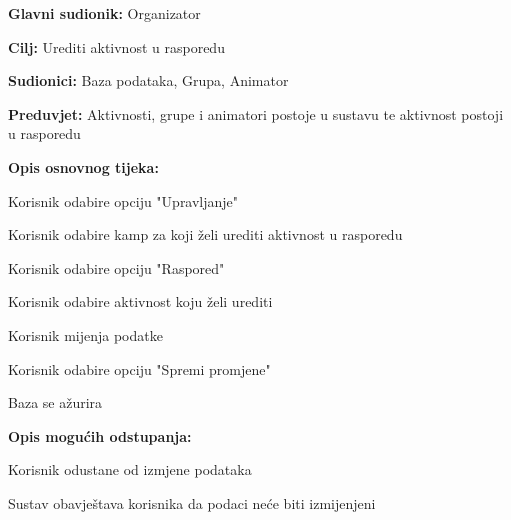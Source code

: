 					\noindent {}
					\begin{packed_item}
						
						\item \textbf{Glavni sudionik: } Organizator
						\item  \textbf{Cilj:} Urediti aktivnost u rasporedu
						\item  \textbf{Sudionici:} Baza podataka, Grupa, Animator
						\item  \textbf{Preduvjet:} Aktivnosti, grupe i animatori postoje u sustavu te aktivnost postoji u rasporedu
						\item  \textbf{Opis osnovnog tijeka:}
						
						\item[] \begin{packed_enum}
							
							\item Korisnik odabire opciju "Upravljanje"
							\item Korisnik odabire kamp za koji želi urediti aktivnost u rasporedu
							\item Korisnik odabire opciju "Raspored"
							\item Korisnik odabire aktivnost koju želi urediti
							\item Korisnik mijenja podatke
							\item Korisnik odabire opciju "Spremi promjene"
							\item Baza se ažurira

						\end{packed_enum}
						
						\item  \textbf{Opis mogućih odstupanja:}
						
						\item[] \begin{packed_item}
							
							\item[5.a] Korisnik odustane od izmjene podataka
							\item[] \begin{packed_enum}
								
								\item Sustav obavještava korisnika da podaci neće biti izmijenjeni
								
							\end{packed_enum}					
						\end{packed_item}
					\end{packed_item}
				

